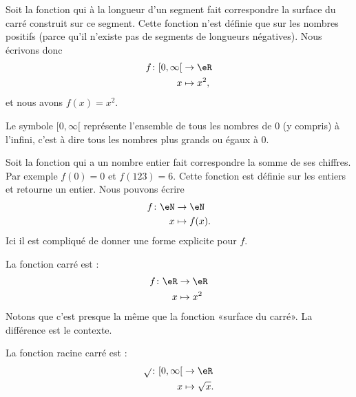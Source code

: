 \begin{example}
    Soit la fonction qui à la longueur d'un segment fait correspondre la surface du carré construit sur ce segment. Cette fonction n'est définie que sur les nombres positifs (parce qu'il n'existe pas de segments de longueurs négatives). Nous écrivons donc
    \begin{equation}
        \begin{aligned}
            f\colon \mathopen[ 0 , \infty [&\to \eR \\
            x&\mapsto x^2,
        \end{aligned}
    \end{equation}
    et nous avons \( f(x)=x^2\).

    Le symbole \( \mathopen[ 0 , \infty [\) représente l'ensemble de tous les nombres de \( 0\) (y compris) à l'infini, c'est à dire tous les nombres plus grands ou égaux à \( 0\).
\end{example}

\begin{example}
    Soit la fonction qui a un nombre entier fait correspondre la somme de ses chiffres. Par exemple \( f(0)=0\) et \( f(123)=6\). Cette fonction est définie sur les entiers et retourne un entier. Nous pouvons écrire
    \begin{equation}
        \begin{aligned}
            f\colon \eN&\to \eN \\
            x&\mapsto f(x). 
        \end{aligned}
    \end{equation}
    Ici il est compliqué de donner une forme explicite pour \( f\).
\end{example}

\begin{example}
    La fonction carré est :
    \begin{equation}
        \begin{aligned}
            f\colon \eR&\to \eR \\
            x&\mapsto x^2 
        \end{aligned}
    \end{equation}
    Notons que c'est presque la même que la fonction «surface du carré». La différence est le contexte.
\end{example}

\begin{example}
    La fonction racine carré est :
    \begin{equation}
        \begin{aligned}
            \sqrt{}\colon \mathopen[ 0 , \infty [&\to \eR  \\
                x&\mapsto \sqrt{x}. 
        \end{aligned}
    \end{equation}
\end{example}

